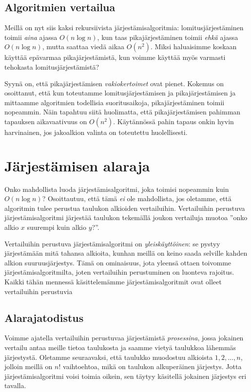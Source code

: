 \subsection{Algoritmien vertailua}

Meillä on nyt siis kaksi rekursiivista järjestämisalgoritmia:
lomitusjärjestä\-minen toimii \emph{aina} ajassa $O(n \log n)$,
kun taas pikajärjestäminen toimii \emph{ehkä} ajassa $O(n \log n)$,
mutta saattaa viedä aikaa $O(n^2)$.
Miksi haluaisimme koskaan käyttää epävarmaa pikajärjestämistä,
kun voimme käyttää myös varmasti tehokasta lomitusjärjestämistä?

Syynä on, että pikajärjestämisen \emph{vakiokertoimet} ovat pienet.
Kokemus on osoittanut, että kun toteutamme lomitusjärjestämisen ja
pikajärjestämisen ja mittaamme algoritmien todellisia suoritusaikoja,
pikajärjestäminen toimii nopeammin.
Näin tapahtuu siitä huolimatta, että pikajärjestämisen pahimman
tapauksen aikavaativuus on $O(n^2)$.
Käytännössä pahin tapaus onkin hyvin harvinainen,
jos jakoalkion valinta on toteutettu huolellisesti.

\section{Järjestämisen alaraja}

Onko mahdollista luoda järjestämisalgoritmi, joka toimisi
nopeammin kuin $O(n \log n)$?
Osoittautuu, että tämä \emph{ei} ole mahdollista,
jos oletamme, että algoritmin tulee perustua taulukon
alkioiden vertailuihin.
Vertailuihin perustuva järjestämisalgoritmi järjestää taulukon
tekemällä joukon vertailuja muotoa
''onko alkio $x$ suurempi kuin alkio $y$?''.

Vertailuihin perustuva järjestämisalgoritmi on \emph{yleiskäyttöinen}:
se pystyy järjestämään mitä tahansa alkioita,
kunhan meillä on keino saada selville kahden alkion suuruusjärjestys.
Tämä on ominaisuus, jota yleensä ottaen toivomme
järjestämisalgoritmilta, joten vertailuihin perustuminen
on luonteva rajoitus.
Kaikki tähän mennessä käsittelemämme järjestämisalgoritmit
ovat olleet vertailuihin perustuvia

\subsection{Alarajatodistus}

Voimme ajatella vertailuihin perustuvaa järjestämistä
\emph{prosessina}, jossa jokainen vertailu antaa meille tietoa
taulukosta ja saamme vietyä taulukkoa lähemmäs järjestystä.
Oletamme seuraavaksi, että taulukko muodostuu alkioista
$1,2,\dots,n$, jolloin meillä on $n!$ vaihtoehtoa, mikä
on taulukon alkuperäinen järjestys.
Jotta järjestämisalgoritmi voisi toimia oikein,
sen täytyy käsitellä jokainen järjestys eri tavalla.

